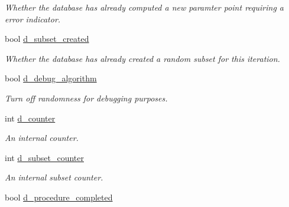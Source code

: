 \begin{DoxyCompactItemize}
\begin{DoxyCompactList}\small\item\em Whether the database has already computed a new paramter point requiring a error indicator. \end{DoxyCompactList}\item 
\hypertarget{class_c_a_r_o_m_1_1_greedy_parameter_point_sampler_ae7cf6ac5bbb87493d16b13b67597269f}{bool \hyperlink{class_c_a_r_o_m_1_1_greedy_parameter_point_sampler_ae7cf6ac5bbb87493d16b13b67597269f}{d\-\_\-subset\-\_\-created}}\label{class_c_a_r_o_m_1_1_greedy_parameter_point_sampler_ae7cf6ac5bbb87493d16b13b67597269f}

\begin{DoxyCompactList}\small\item\em Whether the database has already created a random subset for this iteration. \end{DoxyCompactList}\item 
\hypertarget{class_c_a_r_o_m_1_1_greedy_parameter_point_sampler_a8d181f99cb197d20d995a92a1b28ec46}{bool \hyperlink{class_c_a_r_o_m_1_1_greedy_parameter_point_sampler_a8d181f99cb197d20d995a92a1b28ec46}{d\-\_\-debug\-\_\-algorithm}}\label{class_c_a_r_o_m_1_1_greedy_parameter_point_sampler_a8d181f99cb197d20d995a92a1b28ec46}

\begin{DoxyCompactList}\small\item\em Turn off randomness for debugging purposes. \end{DoxyCompactList}\item 
\hypertarget{class_c_a_r_o_m_1_1_greedy_parameter_point_sampler_a901215a8f295380a6f167a8385df98d6}{int \hyperlink{class_c_a_r_o_m_1_1_greedy_parameter_point_sampler_a901215a8f295380a6f167a8385df98d6}{d\-\_\-counter}}\label{class_c_a_r_o_m_1_1_greedy_parameter_point_sampler_a901215a8f295380a6f167a8385df98d6}

\begin{DoxyCompactList}\small\item\em An internal counter. \end{DoxyCompactList}\item 
\hypertarget{class_c_a_r_o_m_1_1_greedy_parameter_point_sampler_afdd83ef627f0beed515292095ce474a9}{int \hyperlink{class_c_a_r_o_m_1_1_greedy_parameter_point_sampler_afdd83ef627f0beed515292095ce474a9}{d\-\_\-subset\-\_\-counter}}\label{class_c_a_r_o_m_1_1_greedy_parameter_point_sampler_afdd83ef627f0beed515292095ce474a9}

\begin{DoxyCompactList}\small\item\em An internal subset counter. \end{DoxyCompactList}\item 
\hypertarget{class_c_a_r_o_m_1_1_greedy_parameter_point_sampler_a973272647260a40621ed1eeed8685e2c}{bool \hyperlink{class_c_a_r_o_m_1_1_greedy_parameter_point_sampler_a973272647260a40621ed1eeed8685e2c}{d\-\_\-procedure\-\_\-completed}}\label{class_c_a_r_o_m_1_1_greedy_parameter_point_sampler_a973272647260a40621ed1eeed8685e2c}


\end{DoxyCompactItemize}
